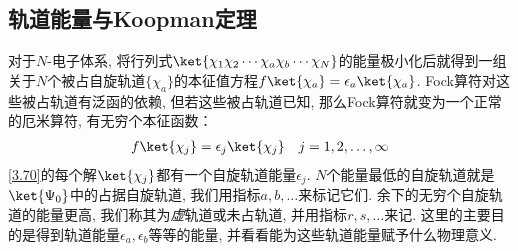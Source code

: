 \subsection{轨道能量与Koopman定理}
对于$N$-电子体系, 将行列式$\ket{\chi_1\chi_2\cdots\chi_a\chi_b\cdots\chi_N}$的能量极小化后就得到一组关于$N$个被占自旋轨道$\{\chi_a\}$的本征值方程$f\ket{\chi_a} = \epsilon_a\ket{\chi_a}$. Fock算符对这些被占轨道有泛函的依赖, 但若这些被占轨道已知, 那么Fock算符就变为一个正常的厄米算符, 有无穷个本征函数：
\begin{align}
\label{3.70}
f\ket{\chi_j} = \epsilon_j\ket{\chi_j}\quad j = 1,2,\ldots,\infty
\end{align}
\eqref{3.70}的每个解$\ket{\chi_j}$都有一个自旋轨道能量$\epsilon_j$. $N$个能量最低的自旋轨道就是$\ket{\Psi_0}$中的占据自旋轨道, 我们用指标$a,b,\ldots$来标记它们. 余下的无穷个自旋轨道的能量更高, 我们称其为\emph{虚}轨道或未占轨道, 并用指标$r,s,\ldots$来记. 这里的主要目的是得到轨道能量$\epsilon_a,\epsilon_b$等等的能量, 并看看能为这些轨道能量赋予什么物理意义.

